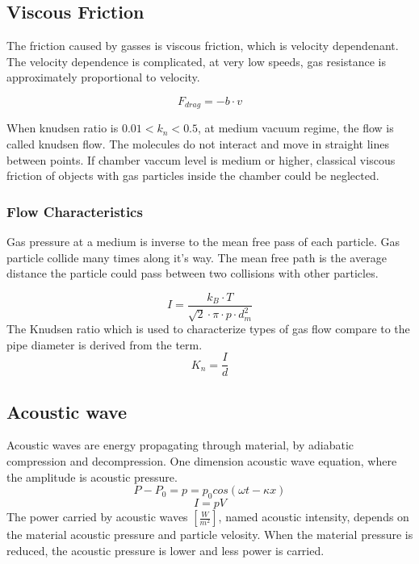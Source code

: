 \documentclass[\main/master.tex]{subfiles}
\begin{document}
\subsection{Viscous Friction}
The friction caused by gasses is viscous friction, which is velocity dependenant. The velocity dependence is complicated, at very low speeds, gas resistance is approximately proportional to velocity. 

\begin{equation}
F_{drag} = -b\cdot v  \label{eqn:energy-mass-equivalence-relation}
\end{equation}

When knudsen ratio is $0.01<k_n<0.5$, at medium vacuum regime, the flow is called knudsen flow. The molecules do not interact and move in straight lines between points. If chamber vaccum level is medium or higher, classical viscous friction of objects with gas particles inside the chamber could be neglected.
\subsubsection{Flow Characteristics}
Gas pressure at a medium is inverse to the mean free pass of each particle. Gas particle collide many times along it's way. The mean free path is the average distance the particle could pass between two collisions with other particles. 


\begin{equation}
I = \frac{k_B\cdot T}{\sqrt{2}\cdot\pi\cdot p\cdot d_m^2}     \label{eqn:mean-free-pass}
\end{equation}
 The Knudsen ratio which is used to characterize types of gas flow compare to the pipe diameter is derived from the term.
\begin{equation}
K_n = \frac{I}{d}     \label{eqn:mean-free-pass}
\end{equation}

\subsection{Acoustic wave}
Acoustic waves are energy propagating through material, by adiabatic compression and decompression. One dimension acoustic wave equation, where the amplitude is acoustic pressure.
\begin{equation}
P-P_0 = p = p_0cos(\omega t -\kappa x)       \label{eqn:acoustic_pressure}
\end{equation}
\begin{equation}
I = pV      \label{eqn:acoustic_intensity}
\end{equation} 
The power carried by acoustic waves $[\frac{W}{m^2}]$, named acoustic intensity, depends on the material acoustic pressure and particle velosity. When the material pressure is reduced, the acoustic pressure is lower and less power is carried.
\end{document}
